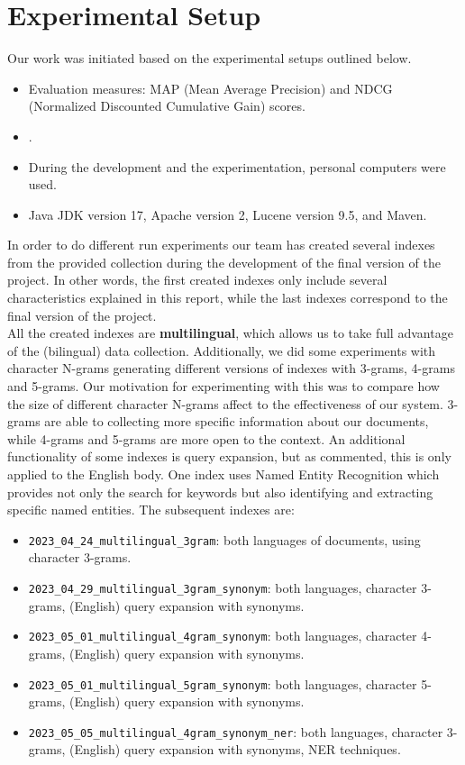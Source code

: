 \section{Experimental Setup}
\label{sec:setup}

Our work was initiated based on the experimental setups outlined below.
\begin{itemize}
	\item Evaluation measures: MAP (Mean Average Precision) and NDCG (Normalized Discounted Cumulative Gain) scores.
	\item \citep[Repository]{jihuming}.
	\item During the development and the experimentation, personal computers were used.
	\item Java JDK version 17, Apache version 2, Lucene version 9.5, and Maven.
\end{itemize}
In order to do different run experiments our team has created several indexes from the provided collection during the
development of the final version of the project.
In other words, the first created indexes only include several characteristics explained in this report, while the last
indexes correspond to the final version of the project.\\
All the created indexes are \textbf{multilingual}, which allows us to take full advantage of the (bilingual) data
collection.
Additionally, we did some experiments with character N-grams generating different versions of indexes with 3-grams,
4-grams and 5-grams.
Our motivation for experimenting with this was to compare how the size of different character N-grams affect to the
effectiveness of our system.
3-grams are able to collecting more specific information about our documents, while 4-grams and 5-grams are more open
to the context.
An additional functionality of some indexes is query expansion, but as commented, this is only applied to the English
body.
One index uses Named Entity Recognition which provides not only the search for keywords but also identifying and
extracting specific named entities.
The subsequent indexes are:
\begin{itemize}
	\item \texttt{2023\_04\_24\_multilingual\_3gram}: both languages of documents, using character 3-grams.
	\item \texttt{2023\_04\_29\_multilingual\_3gram\_synonym}: both languages, character 3-grams, (English) query expansion with synonyms.
	\item \texttt{2023\_05\_01\_multilingual\_4gram\_synonym}: both languages, character 4-grams, (English) query expansion with synonyms.
	\item \texttt{2023\_05\_01\_multilingual\_5gram\_synonym}: both languages, character 5-grams, (English) query expansion with synonyms.
	\item \texttt{2023\_05\_05\_multilingual\_4gram\_synonym\_ner}: both languages, character 3-grams, (English) query expansion with synonyms, NER techniques.
\end{itemize}


